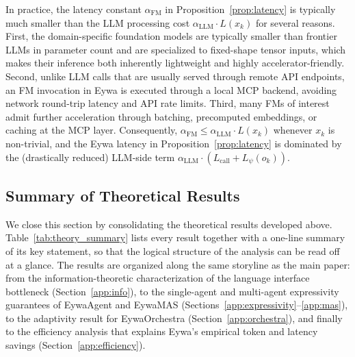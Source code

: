 \documentclass{llmxive}
\begin{document}
{In practice, the latency constant $\alpha_{\mathrm{FM}}$ in Proposition~\ref{prop:latency} is typically much smaller than the LLM processing cost $\alpha_{\mathrm{LLM}}\cdot L(x_k)$ for several reasons. First, the domain-specific foundation models are typically smaller than frontier LLMs in parameter count and are specialized to fixed-shape tensor inputs, which makes their inference both inherently lightweight and highly accelerator-friendly. Second, unlike LLM calls that are usually served through remote API endpoints, an FM invocation in Eywa is executed through a local MCP backend, avoiding network round-trip latency and API rate limits. Third, many FMs of interest admit further acceleration through batching, precomputed embeddings, or caching at the MCP layer. Consequently, $\alpha_{\mathrm{FM}}\le\alpha_{\mathrm{LLM}}\cdot L(x_k)$ whenever $x_k$ is non-trivial, and the Eywa latency in Proposition~\ref{prop:latency} is dominated by the (drastically reduced) LLM-side term $\alpha_{\mathrm{LLM}}\cdot(L_{\mathrm{call}}+L_{\psi}(o_k))$.



\subsection{Summary of Theoretical Results}
\label{app:summary}

We close this section by consolidating the theoretical results developed above. Table~\ref{tab:theory_summary} lists every result together with a one-line summary of its key statement, so that the logical structure of the analysis can be read off at a glance. The results are organized along the same storyline as the main paper: from the information-theoretic characterization of the language interface bottleneck (Section~\ref{app:info}), to the single-agent and multi-agent expressivity guarantees of EywaAgent and EywaMAS (Sections~\ref{app:expressivity}--\ref{app:mas}), to the adaptivity result for EywaOrchestra (Section~\ref{app:orchestra}), and finally to the efficiency analysis that explains Eywa's empirical token and latency savings (Section~\ref{app:efficiency}).


}
\end{document}
